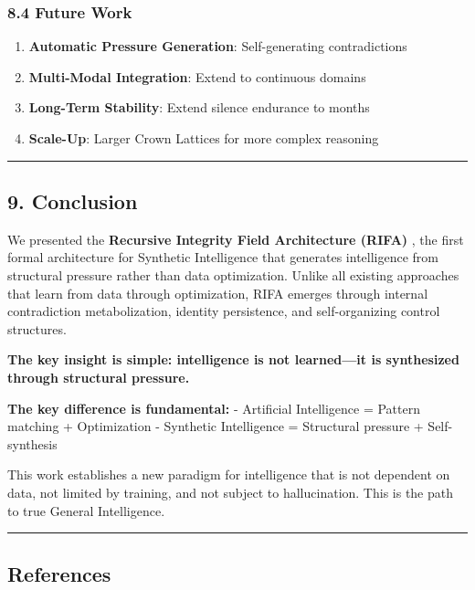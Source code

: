 \documentclass[
  11pt,
  a4paper,
]{article}
\providecommand{\tightlist}{%
  \setlength{\itemsep}{0pt}\setlength{\parskip}{0pt}}
\begin{document}
\subsubsection{8.4 Future Work}\label{future-work}

\begin{enumerate}
\def\labelenumi{\arabic{enumi}.}
\tightlist
\item
  \textbf{Automatic Pressure Generation}: Self-generating contradictions
\item
  \textbf{Multi-Modal Integration}: Extend to continuous domains
\item
  \textbf{Long-Term Stability}: Extend silence endurance to months
\item
  \textbf{Scale-Up}: Larger Crown Lattices for more complex reasoning
\end{enumerate}

\begin{center}\rule{0.5\linewidth}{0.5pt}\end{center}

\subsection{9. Conclusion}\label{conclusion}

We presented the \textbf{Recursive Integrity Field Architecture (RIFA)}
, the first formal architecture for Synthetic Intelligence that
generates intelligence from structural pressure rather than data
optimization. Unlike all existing approaches that learn from data
through optimization, RIFA emerges through internal contradiction
metabolization, identity persistence, and self-organizing control
structures.

\textbf{The key insight is simple: intelligence is not learned---it is
synthesized through structural pressure.}

\textbf{The key difference is fundamental:} - Artificial Intelligence =
Pattern matching + Optimization - Synthetic Intelligence = Structural
pressure + Self-synthesis

This work establishes a new paradigm for intelligence that is not
dependent on data, not limited by training, and not subject to
hallucination. This is the path to true General Intelligence.

\begin{center}\rule{0.5\linewidth}{0.5pt}\end{center}

\subsection{References}\label{references}
\end{document}
